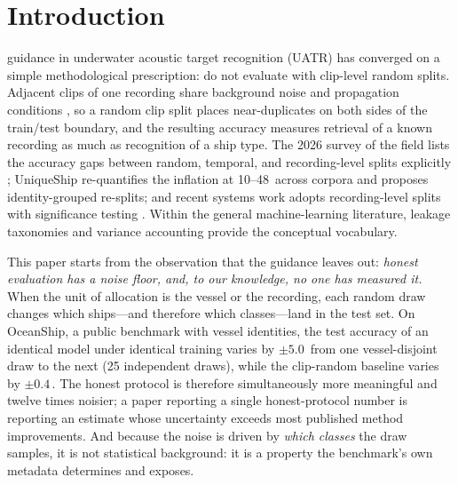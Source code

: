 ﻿\documentclass[journal]{IEEEtran}
\newcommand{\pp}{\,\text{pp}}
\begin{document}
\section{Introduction}
 guidance in underwater acoustic target recognition (UATR) has converged on
a simple methodological prescription: do not evaluate with clip-level random splits. Adjacent clips
of one recording share background noise and propagation conditions \cite{review2026}, so a random
clip split places near-duplicates on both sides of the train/test boundary, and the resulting
accuracy measures retrieval of a known recording as much as recognition of a ship type. The 2026
survey of the field lists the accuracy gaps between random, temporal, and recording-level splits
explicitly \cite{review2026}; UniqueShip \cite{uniqueship2026} re-quantifies the inflation at
10--48\pp{} across corpora and proposes identity-grouped re-splits; and recent systems work adopts
recording-level splits with significance testing \cite{boosting2026}. Within the general
machine-learning literature, leakage taxonomies \cite{kapoor2023} and variance accounting
\cite{bouthillier2021} provide the conceptual vocabulary.

This paper starts from the observation that the guidance leaves out: \emph{honest evaluation has a
noise floor, and, to our knowledge, no one has measured it.} When the unit of allocation is the vessel or the
recording, each random draw changes which ships---and therefore which classes---land in the test
set. On OceanShip, a public benchmark with vessel identities, the test accuracy of an
identical model under identical training varies by $\pm5.0$\pp{} from one vessel-disjoint draw to
the next (25 independent draws), while the clip-random baseline varies by $\pm0.4$\pp. The honest protocol is therefore
simultaneously more meaningful and twelve times noisier; a paper reporting a single honest-protocol
number is reporting an estimate whose uncertainty exceeds most published method improvements. And
because the noise is driven by \emph{which classes} the draw samples, it is not statistical
background: it is a property the benchmark's own metadata determines and exposes.
\end{document}
